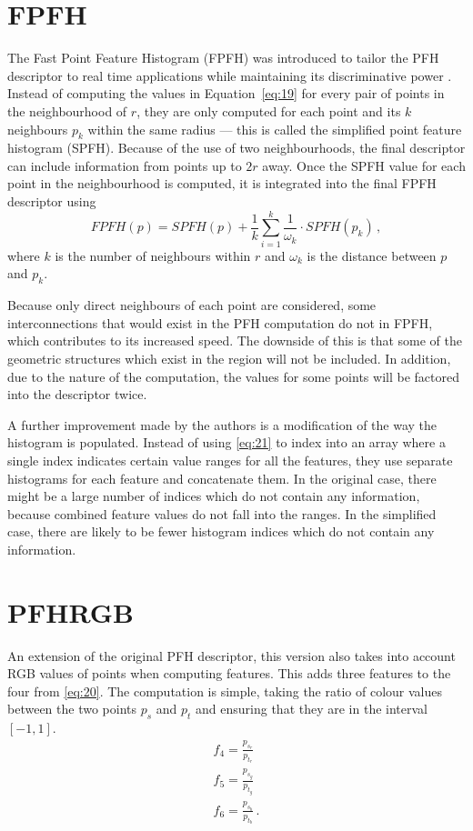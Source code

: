 \documentclass[11pt,a4paper]{kth-mag}
\begin{document}
\section{FPFH}
The Fast Point Feature Histogram (FPFH) was introduced to tailor the PFH
descriptor to real time applications while maintaining its discriminative power
\cite{rusu2009fast}. Instead of computing the values in Equation~\eqref{eq:19}
for every pair of points in the neighbourhood of $r$, they are only computed for
each point and its $k$ neighbours $p_k$ within the same radius --- this is
called the simplified point feature histogram (SPFH). Because of the use of two
neighbourhoods, the final descriptor can include information from points up to
$2r$ away. Once the SPFH value for each point in the neighbourhood is computed,
it is integrated into the final FPFH descriptor using
\begin{equation}
  \label{eq:20}
  FPFH(p)=SPFH(p)+\frac{1}{k}\sum^k_{i=1}\frac{1}{\omega_k}\cdot SPFH(p_k)\,,
\end{equation}
where $k$ is the number of neighbours within $r$ and $\omega_k$ is the distance
between $p$ and $p_k$.

Because only direct neighbours of each point are considered, some
interconnections that would exist in the PFH computation do not in FPFH, which
contributes to its increased speed. The downside of this is that some of the
geometric structures which exist in the region will not be included. In
addition, due to the nature of the computation, the values for some points will
be factored into the descriptor twice.

A further improvement made by the authors is a modification of the way the
histogram is populated. Instead of using \eqref{eq:21} to index into
an array where a single index indicates certain value ranges for all the
features, they use separate histograms for each feature and concatenate them.
In the original case, there might be a large number of indices which do not
contain any information, because combined feature values do not fall into the
ranges. In the simplified case, there are likely to be fewer histogram indices
which do not contain any information.
\section{PFHRGB}
An extension of the original PFH descriptor, this version also takes into
account RGB values of points when computing features. This adds three features
to the four from \eqref{eq:20}. The computation is simple, taking the
ratio of colour values between the two points $p_s$ and $p_t$ and ensuring that
they are in the interval $\left[-1,1\right]$.
\begin{align}
  \label{eq:22}
  f_4=\frac{p_{s_r}}{p_{t_r}}\\
  f_5=\frac{p_{s_g}}{p_{t_g}}\\
  f_6=\frac{p_{s_b}}{p_{t_b}}\,.
\end{align}
\end{document}
